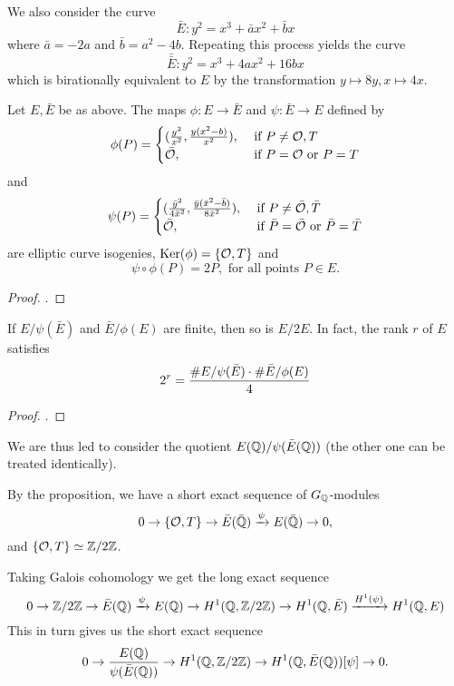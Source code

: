 \documentclass[12pt, a4paper]{report}
\begin{document}
We also consider the curve
\[ \bar{E} : y^2 = x^3 + \bar{a}x^2 + \bar{b}x \]
where $\bar{a} = -2a$ and $\bar{b} = a^2 - 4b$. Repeating this process yields
the curve
\[ \bar{\bar{E}} : y^2 = x^3 +  4ax^2 + 16bx\]
which is birationally equivalent to $E$ by the transformation $y \mapsto 8y,
x \mapsto 4x$.

\begin{prop}
  Let $E, \bar{E}$ be as above. The maps $\phi : E \rightarrow \bar{E}$ and
  $\psi : \bar{E} \rightarrow E$ defined by
  \[\phi(P) =
    \begin{cases}
      (\frac{y^2}{x^2}, \frac{y(x^2-b)}{x^2}), & \text{ if } P \neq {\mathcal O}, T \\
      \bar{{\mathcal O}}, & \text{ if } P = {\mathcal O} \text{ or } P = T
    \end{cases}\]
  and
  \[\psi(P) =
    \begin{cases}
      (\frac{\bar{y}^2}{4\bar{x}^2}, \frac{\bar{y}(\bar{x}^2-\bar{b})}{8\bar{x}^2}),
      & \text{ if } P \neq \bar{{\mathcal O}}, \bar{T} \\
      \bar{{\mathcal O}}, & \text{ if } \bar{P} = \bar{{\mathcal O}} \text{ or } \bar{P} = \bar{T}
    \end{cases}\]
  are elliptic curve isogenies, $\text{Ker}(\phi) = \{{\mathcal O}, T\}$ and
  \[ \psi \circ \phi (P) = 2P , \text{ for all points } P \in E.\]
\end{prop}
\begin{proof}
  \cite[See][Chapter 4, page 79]{rational}.
\end{proof}

\begin{lemma} \label{lemma:rankformula}
  If $E / \psi(\bar{E})$ and $\bar{E} / \phi(E)$ are finite, then so is $E/2E$.
  In fact, the rank $r$ of $E$ satisfies
  \[2^r = \frac{\#E/\psi(\bar{E}) \cdot \#\bar{E}/\phi(E)}{4}\]
\end{lemma}
\begin{proof}
  \cite[See][Chapter 4, page 83]{rational}.
\end{proof}

We are thus led to consider the quotient $E({\mathbb Q}) / \psi(\bar{E}({\mathbb Q}))$ (the
other one can be treated identically).

By the proposition, we have a short exact sequence of $G_{{\mathbb Q}}$-modules
\[ 0 \rightarrow \{{\mathcal O}, T\} \rightarrow \bar{E}(\bar{{\mathbb Q}}) \xrightarrow[]{\psi}
  E(\bar{{\mathbb Q}})
  \rightarrow 0,\]
and $\{{\mathcal O}, T\} \simeq {\mathbb Z}/2{\mathbb Z}$.

Taking Galois cohomology we get the long exact sequence
\[ 0 \rightarrow {\mathbb Z} / 2{\mathbb Z} \rightarrow \bar{E}({\mathbb Q}) \xrightarrow[]{\psi} E({\mathbb Q})
  \rightarrow H^1({\mathbb Q}, {\mathbb Z}/2{\mathbb Z}) \rightarrow H^1({\mathbb Q}, \bar{E}) \xrightarrow{H^1(\psi)}
  H^1({\mathbb Q}, E)\]
This in turn gives us the short exact sequence
\[ 0 \rightarrow \frac{E({\mathbb Q})}{\psi(\bar{E} ({\mathbb Q}))} \rightarrow
  H^1({\mathbb Q}, {\mathbb Z} / 2{\mathbb Z}) \rightarrow H^1({\mathbb Q}, \bar{E}({\mathbb Q}))[\psi] \rightarrow 0.\]
\end{document}
